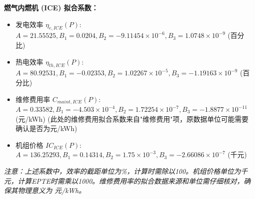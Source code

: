 \documentclass[12pt]{ctexart}
\begin{document}
\textbf{燃气内燃机 (ICE) 拟合系数：}
\begin{itemize}
    \item 发电效率 $\eta_{e,ICE}(P)$: $A=21.55525, B_1=0.0204, B_2=-9.11454 \times 10^{-6}, B_3=1.0748 \times 10^{-9}$ (百分比)
    \item 热电效率 $\eta_{th,ICE}(P)$: $A=80.92531, B_1=-0.02353, B_2=1.02267 \times 10^{-5}, B_3=-1.19163 \times 10^{-9}$ (百分比)
    \item 维修费用率 $C_{maint,ICE}(P)$: $A=0.33582, B_1=-4.503 \times 10^{-4}, B_2=1.72254 \times 10^{-7}, B_3=-1.8877 \times 10^{-11}$ (元/kWh) (此处的维修费用拟合系数来自"维修费用"项，原数据单位可能需要确认是否为元/kWh)
    \item 机组价格 $IC_{ICE}(P)$: $A=136.25293, B_1=0.14314, B_2=1.75 \times 10^{-3}, B_3=-2.66086 \times 10^{-7}$ (千元)
\end{itemize}
\textit{注意：上述系数中，效率的截距单位为\%，计算时需除以100。机组价格单位为千元，计算EPTE时需乘以1000。维修费用率的拟合数据来源和单位需仔细核对，确保其物理意义为 元/kWh。 }
\end{document}
